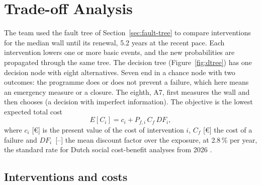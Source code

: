 \section{Trade-off Analysis}
\label{sec:tradeoff}

The team used the fault tree of Section~\ref{sec:fault-tree} to compare
interventions for the median wall until its renewal, 5.2 years at the recent
pace. Each intervention lowers one or more basic events, and the new
probabilities are propagated through the same tree. The decision tree
(Figure~\ref{fig:dtree}) has one decision node with eight alternatives. Seven end
in a chance node with two outcomes: the programme does or does not prevent a
failure, which here means an emergency measure or a closure. The eighth, A7,
first measures the wall and then chooses (a decision with imperfect information). The
objective is the lowest expected total cost
\begin{equation}
  E[C_i] = c_i + P_{f,i}\, C_f\, \mathit{DF}_i ,
\end{equation}
where $c_i$ [\euro] is the present value of the cost of intervention $i$, $C_f$
[\euro] the cost of a failure and $\mathit{DF}_i$~\mbox{[--]} the mean discount factor
over the exposure, at 2.8\,\% per year, the standard rate for Dutch social
cost-benefit analyses from 2026 \parencite{discontovoet2025}.

\subsection{Interventions and costs}\label{sec:to-interventions}

